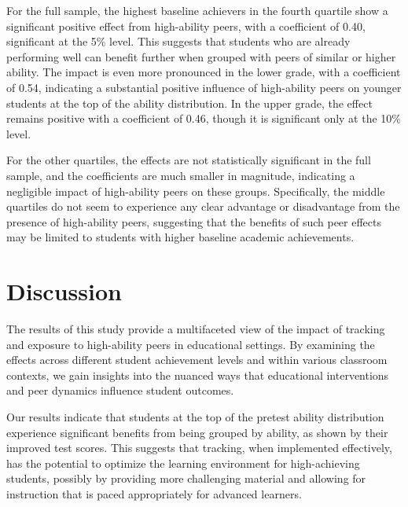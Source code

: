 \documentclass[12pt]{article}
\begin{document}
For the full sample, the highest baseline achievers in the fourth quartile show a significant positive effect from high-ability peers, with a coefficient of 0.40, significant at the 5\% level. This suggests that students who are already performing well can benefit further when grouped with peers of similar or higher ability. The impact is even more pronounced in the lower grade, with a coefficient of 0.54, indicating a substantial positive influence of high-ability peers on younger students at the top of the ability distribution. In the upper grade, the effect remains positive with a coefficient of 0.46, though it is significant only at the 10\% level.

For the other quartiles, the effects are not statistically significant in the full sample, and the coefficients are much smaller in magnitude, indicating a negligible impact of high-ability peers on these groups. Specifically, the middle quartiles do not seem to experience any clear advantage or disadvantage from the presence of high-ability peers, suggesting that the benefits of such peer effects may be limited to students with higher baseline academic achievements.

\section{Discussion}
\label{sec:discuss}


The results of this study provide a multifaceted view of the impact of tracking and exposure to high-ability peers in educational settings. By examining the effects across different student achievement levels and within various classroom contexts, we gain insights into the nuanced ways that educational interventions and peer dynamics influence student outcomes.

Our results indicate that students at the top of the pretest ability distribution experience significant benefits from being grouped by ability, as shown by their improved test scores. This suggests that tracking, when implemented effectively, has the potential to optimize the learning environment for high-achieving students, possibly by providing more challenging material and allowing for instruction that is paced appropriately for advanced learners.

\end{document}
